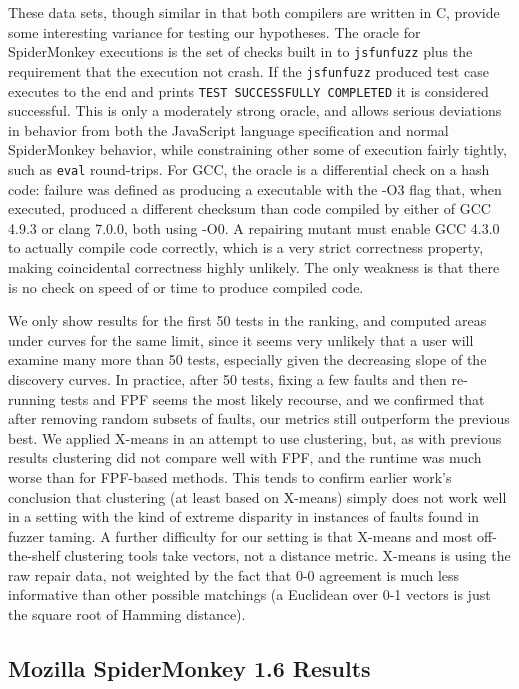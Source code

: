 These data sets, though similar in that both compilers are written in C, provide some interesting variance for testing our hypotheses.  The oracle for SpiderMonkey executions is the set of checks built in to {\tt jsfunfuzz} plus the requirement that the execution not crash.   If the {\tt jsfunfuzz} produced test case executes to the end and prints {\tt TEST SUCCESSFULLY COMPLETED} it is considered successful.  This is only a moderately strong oracle, and allows serious deviations in behavior from both the JavaScript language specification and normal SpiderMonkey behavior, while constraining other some of execution fairly tightly, such as {\tt eval} round-trips.  For GCC, the oracle is a differential check on a hash code:  failure was defined as producing a executable with the -O3 flag that, when executed, produced a different checksum than code compiled by either of GCC 4.9.3 or clang 7.0.0, both using -O0.  A repairing mutant must enable GCC 4.3.0 to actually compile code correctly, which is a very strict correctness property, making coincidental correctness \cite{CCT} highly unlikely.  The only weakness is that there is no check on speed of or time to produce compiled code.

We only show results for the first 50 tests in the ranking, and computed areas under curves for the same limit, since it seems very unlikely that a user will examine many more than 50 tests, especially given the decreasing slope of the discovery curves.  In practice, after 50 tests, fixing a few faults and then re-running tests and FPF seems the most likely recourse, and we confirmed that after removing random subsets of faults, our metrics still outperform the previous best.  We applied X-means \cite{xmeans} in an attempt to use clustering, but, as with previous results \cite{PLDI13} clustering did not compare well with FPF, and the runtime was much worse than for FPF-based methods.  This tends to confirm earlier work's \cite{PLDI13} conclusion that clustering (at least based on X-means) simply does not work well in a setting with the kind of extreme disparity in instances of faults found in fuzzer taming.  A further difficulty for our setting is that X-means and most off-the-shelf clustering tools take vectors, not a distance metric.  X-means is using the raw repair data, not weighted by the fact that 0-0 agreement is much less informative than other possible matchings (a Euclidean over 0-1 vectors is just the square root of Hamming distance).

\subsection{Mozilla SpiderMonkey 1.6 Results}


